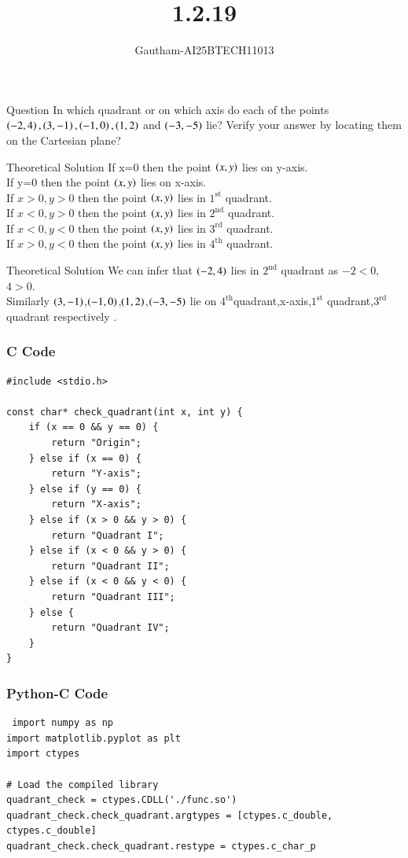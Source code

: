 \documentclass{beamer}
\title %
{1.2.19}
\author %
{Gautham-AI25BTECH11013}
\begin{document}
\frame{\titlepage}
\begin{frame}{Question}
In which quadrant or on which axis do each of the points $\brak{-2,4},\brak{3,-1},\brak{-1,0},\brak{1,2}$ and $\brak{-3,-5}$ lie?       Verify your answer by locating them on the Cartesian plane?
\end{frame}
\begin{frame}{Theoretical Solution}
If x=0 then the point $\brak{x,y}$ lies on y-axis.\\
If y=0 then the point $\brak{x,y}$ lies on x-axis.\\
If $x>0,y>0$ then the point $\brak{x,y}$ lies in $1^\text{st}$ quadrant.\\
If $x<0,y>0$ then the point $\brak{x,y}$ lies in $2^\text{nd}$ quadrant. \\
If $x<0,y<0$ then the point $\brak{x,y}$ lies in $3^\text{rd}$ quadrant. \\
If $x>0,y<0$ then the point $\brak{x,y}$ lies in $4^\text{th}$ quadrant. \\
\end{frame}
\begin{frame}{Theoretical Solution}
    We can infer that $\brak{-2,4}$ lies in $2^\text{nd}$ quadrant as $-2<0$,$4>0$. \\
Similarly $\brak{3,-1}$,$\brak{-1,0}$,$\brak{1,2}$,$\brak{-3,-5}$ lie on $4^\text{th}$quadrant,x-axis,$1^\text{st}$ quadrant,$3^\text{rd}$ quadrant respectively . 
\end{frame}
\begin{frame}[fragile]
\frametitle{C Code}
   \begin{lstlisting}
#include <stdio.h>

const char* check_quadrant(int x, int y) {
    if (x == 0 && y == 0) {
        return "Origin";
    } else if (x == 0) {
        return "Y-axis";
    } else if (y == 0) {
        return "X-axis";
    } else if (x > 0 && y > 0) {
        return "Quadrant I";
    } else if (x < 0 && y > 0) {
        return "Quadrant II";
    } else if (x < 0 && y < 0) {
        return "Quadrant III";
    } else {
        return "Quadrant IV";
    }
}
   \end{lstlisting}
\end{frame}
\begin{frame}[fragile]
\frametitle{Python-C Code}
   \begin{lstlisting}
 import numpy as np
import matplotlib.pyplot as plt
import ctypes

# Load the compiled library
quadrant_check = ctypes.CDLL('./func.so')
quadrant_check.check_quadrant.argtypes = [ctypes.c_double, ctypes.c_double]
quadrant_check.check_quadrant.restype = ctypes.c_char_p
   \end{lstlisting}
\end{frame}
\end{document}
